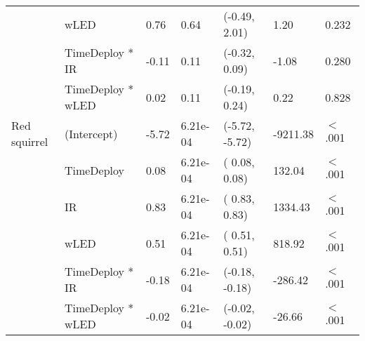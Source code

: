 \begin{table}[ht]
\begin{tabular}{lllllll}
   & wLED & 0.76 & 0.64 & (-0.49,  2.01) & 1.20 & 0.232  \\ 
   & TimeDeploy * IR & -0.11 & 0.11 & (-0.32,  0.09) & -1.08 & 0.280  \\ 
   & TimeDeploy * wLED & 0.02 & 0.11 & (-0.19,  0.24) & 0.22 & 0.828  \\ 
  Red squirrel & (Intercept) & -5.72 & 6.21e-04 & (-5.72, -5.72) & -9211.38 & $<$ .001 \\ 
   & TimeDeploy & 0.08 & 6.21e-04 & ( 0.08,  0.08) & 132.04 & $<$ .001 \\ 
   & IR & 0.83 & 6.21e-04 & ( 0.83,  0.83) & 1334.43 & $<$ .001 \\ 
   & wLED & 0.51 & 6.21e-04 & ( 0.51,  0.51) & 818.92 & $<$ .001 \\ 
   & TimeDeploy * IR & -0.18 & 6.21e-04 & (-0.18, -0.18) & -286.42 & $<$ .001 \\ 
   & TimeDeploy * wLED & -0.02 & 6.21e-04 & (-0.02, -0.02) & -26.66 & $<$ .001 \\ 
   \hline
\end{tabular}
\end{table}
